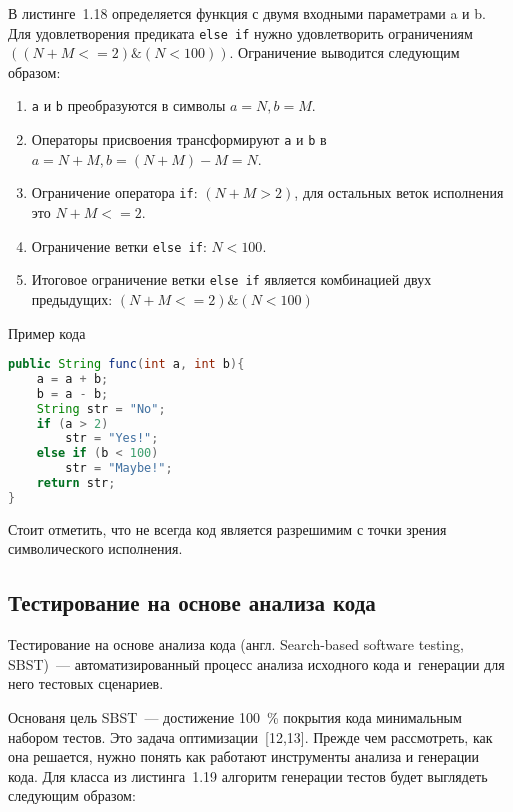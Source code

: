 В листинге~1.18 определяется функция с двумя входными параметрами a и b. Для удовлетворения предиката \texttt{else if} нужно удовлетворить ограничениям \(((N + M <= 2)\&(N < 100))\). Ограничение выводится следующим образом:

\begin{enumerate}
	\item \texttt{a} и \texttt{b} преобразуются в символы  \(a = N, b = M\).
	\item Операторы присвоения трансформируют \texttt{a} и \texttt{b} в  \(a = N + M, b = (N + M) - M = N\).
	\item Ограничение оператора \texttt{if}: \((N + M > 2)\), для остальных веток исполнения это \(N + M <= 2\).
	\item Ограничение ветки \texttt{else if}: \(N < 100\).
	\item Итоговое ограничение ветки \texttt{else if} является комбинацией  двух предыдущих:  \( (N + M <= 2) \& (N < 100)\)
\end{enumerate}

\begin{ListingEnv}[!h]%
	\captiondelim{ } %
	\caption{Пример кода}
	\begin{lstlisting}[language={Java}]
public String func(int a, int b){
	a = a + b;
	b = a - b;
	String str = "No";
	if (a > 2)
		str = "Yes!";
	else if (b < 100)
		str = "Maybe!";
	return str;
}
	\end{lstlisting}
\end{ListingEnv}%

Стоит отметить, что не всегда код является разрешимим с точки зрения символического исполнения.


\subsection{Тестирование на основе анализа кода} 
 
 Тестирование на основе анализа кода (англ. Search-based software testing,  SBST)~--- автоматизированный процесс анализа исходного кода и~генерации для него тестовых сценариев. 
 
 Основаня цель SBST~--- достижение 100~\% покрытия кода минимальным набором тестов. Это задача оптимизации~[12,13]. Прежде чем рассмотреть, как она решается, нужно понять как работают инструменты  анализа и генерации кода. Для класса из листинга~1.19 алгоритм генерации тестов будет выглядеть следующим образом: 
 
